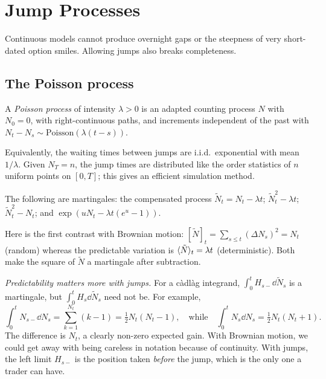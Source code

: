 \chapter{Jump Processes}\label{ch:jumps}

Continuous models cannot produce overnight gaps or the steepness of very short-dated option smiles. Allowing jumps also breaks completeness.

\section{The Poisson process}

\begin{definition}
A \emph{Poisson process} of intensity $\lambda>0$ is an adapted counting process $N$ with $N_0=0$, with right-continuous paths, and increments independent of the past with $N_t-N_s\sim\mathrm{Poisson}(\lambda(t-s))$.
\end{definition}

Equivalently, the waiting times between jumps are i.i.d.\ exponential with mean $1/\lambda$. Given $N_T=n$, the jump times are distributed like the order statistics of $n$ uniform points on $[0,T]$; this gives an efficient simulation method.

\begin{proposition}
The following are martingales: the compensated process $\tilde N_t=N_t-\lambda t$; $\tilde N_t^2-\lambda t$; $\tilde N_t^2-N_t$; and $\exp(uN_t-\lambda t(e^u-1))$.
\end{proposition}

Here is the first contrast with Brownian motion: $[\tilde N]_t=\sum_{s\le t}(\Delta N_s)^2=N_t$ (random) whereas the predictable variation is $\langle \tilde N\rangle_t=\lambda t$ (deterministic). Both make the square of $\tilde N$ a martingale after subtraction.

\begin{pitfall}
\emph{Predictability matters more with jumps.} For a c\`adl\`ag integrand, $\int_0^tH_{s-}\dd\tilde N_s$ is a martingale, but $\int_0^tH_s\dd\tilde N_s$ need not be. For example,
\[
\int_0^tN_{s-}\dd N_s=\sum_{k=1}^{N_t}(k-1)=\tfrac12N_t(N_t-1),\quad\text{while}\quad\int_0^tN_s\dd N_s=\tfrac12N_t(N_t+1).
\]
The difference is $N_t$, a clearly non-zero expected gain. With Brownian motion, we could get away with being careless in notation because of continuity. With jumps, the left limit $H_{s-}$ is the position taken \emph{before} the jump, which is the only one a trader can have.
\end{pitfall}

